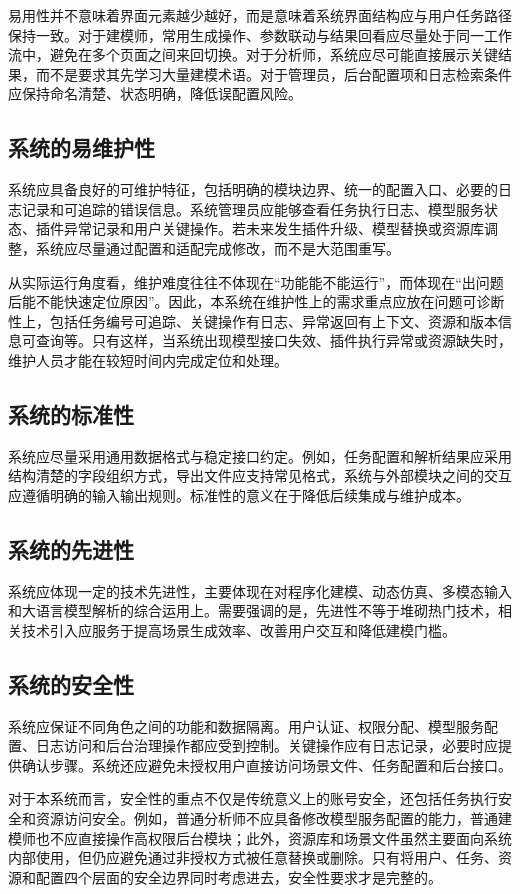 \documentclass[UTF8,a4paper,10pt]{ctexart}
\begin{document}
易用性并不意味着界面元素越少越好，而是意味着系统界面结构应与用户任务路径保持一致。对于建模师，常用生成操作、参数联动与结果回看应尽量处于同一工作流中，避免在多个页面之间来回切换。对于分析师，系统应尽可能直接展示关键结果，而不是要求其先学习大量建模术语。对于管理员，后台配置项和日志检索条件应保持命名清楚、状态明确，降低误配置风险。

\subsection{系统的易维护性}
系统应具备良好的可维护特征，包括明确的模块边界、统一的配置入口、必要的日志记录和可追踪的错误信息。系统管理员应能够查看任务执行日志、模型服务状态、插件异常记录和用户关键操作。若未来发生插件升级、模型替换或资源库调整，系统应尽量通过配置和适配完成修改，而不是大范围重写。

从实际运行角度看，维护难度往往不体现在“功能能不能运行”，而体现在“出问题后能不能快速定位原因”。因此，本系统在维护性上的需求重点应放在问题可诊断性上，包括任务编号可追踪、关键操作有日志、异常返回有上下文、资源和版本信息可查询等。只有这样，当系统出现模型接口失效、插件执行异常或资源缺失时，维护人员才能在较短时间内完成定位和处理。

\subsection{系统的标准性}
系统应尽量采用通用数据格式与稳定接口约定。例如，任务配置和解析结果应采用结构清楚的字段组织方式，导出文件应支持常见格式，系统与外部模块之间的交互应遵循明确的输入输出规则。标准性的意义在于降低后续集成与维护成本。

\subsection{系统的先进性}
系统应体现一定的技术先进性，主要体现在对程序化建模、动态仿真、多模态输入和大语言模型解析的综合运用上。需要强调的是，先进性不等于堆砌热门技术，相关技术引入应服务于提高场景生成效率、改善用户交互和降低建模门槛。

\subsection{系统的安全性}
系统应保证不同角色之间的功能和数据隔离。用户认证、权限分配、模型服务配置、日志访问和后台治理操作都应受到控制。关键操作应有日志记录，必要时应提供确认步骤。系统还应避免未授权用户直接访问场景文件、任务配置和后台接口。

对于本系统而言，安全性的重点不仅是传统意义上的账号安全，还包括任务执行安全和资源访问安全。例如，普通分析师不应具备修改模型服务配置的能力，普通建模师也不应直接操作高权限后台模块；此外，资源库和场景文件虽然主要面向系统内部使用，但仍应避免通过非授权方式被任意替换或删除。只有将用户、任务、资源和配置四个层面的安全边界同时考虑进去，安全性要求才是完整的。
\end{document}
